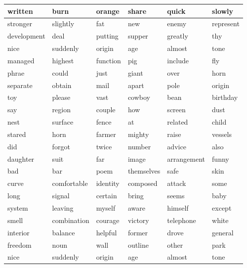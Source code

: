 \documentclass{jcls}
\begin{document}
\begin{longtable}{@{}llllll@{}}
\toprule
written     & burn        & orange   & share      & quick       & slowly    \\* \midrule
\endhead
%
\bottomrule
\endfoot
%
\endlastfoot
%
stronger    & slightly    & fat      & new        & enemy       & represent \\
development & deal        & putting  & supper     & greatly     & thy       \\
nice        & suddenly    & origin   & age        & almost      & tone      \\
managed     & highest     & function & pig        & include     & fly       \\
phrae      & could       & just     & giant      & over        & horn      \\
separate    & obtain      & mail     & apart      & pole        & origin    \\
toy         & please      & vast     & cowboy     & bean        & birthday  \\
say         & region      & couple   & how        & screen      & dust      \\
nest        & surface     & fence    & at         & related     & child     \\
stared      & horn        & farmer   & mighty     & raise       & vessels   \\
did         & forgot      & twice    & number     & advice      & also      \\
daughter    & suit        & far      & image      & arrangement & funny     \\
bad         & bar         & poem     & themselves & safe        & skin      \\
curve       & comfortable & identity & composed   & attack      & some      \\
long        & signal      & certain  & bring      & seems       & baby      \\
system      & leaving     & myself   & aware      & himself     & except    \\
smell       & combination & courage  & victory    & telephone   & white     \\
interior    & balance     & helpful  & former     & drove       & general   \\
freedom     & noun        & wall     & outline    & other       & park      \\
nice        & suddenly    & origin   & age        & almost      & tone      \\

\end{longtable}
\end{document}
